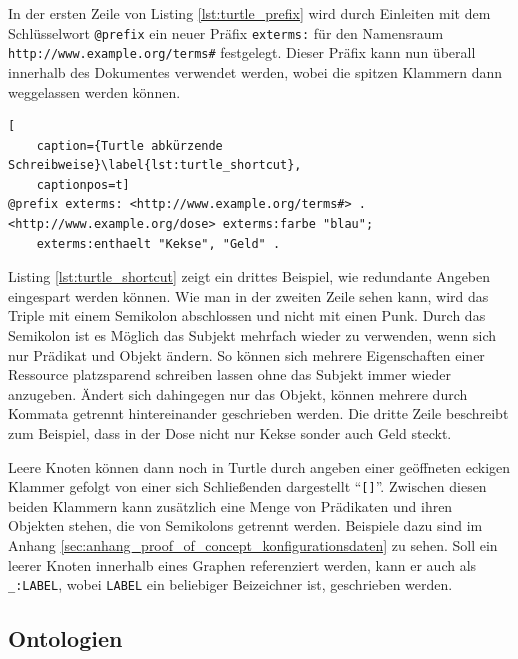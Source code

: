 In der ersten Zeile von Listing \ref{lst:turtle_prefix} wird durch Einleiten mit dem Schlüsselwort \texttt{@prefix} ein neuer Präfix \texttt{exterms:} für den Namensraum \texttt{http://www.example.org/terms\#} festgelegt. Dieser Präfix kann nun überall innerhalb des Dokumentes verwendet werden, wobei die spitzen Klammern dann weggelassen werden können.

\begin{lstlisting}[
    caption={Turtle abkürzende Schreibweise}\label{lst:turtle_shortcut},
    captionpos=t]
@prefix exterms: <http://www.example.org/terms#> .
<http://www.example.org/dose> exterms:farbe "blau";
    exterms:enthaelt "Kekse", "Geld" .   
\end{lstlisting}

Listing \ref{lst:turtle_shortcut} zeigt ein drittes Beispiel, wie redundante Angeben eingespart werden können. Wie man in der zweiten Zeile sehen kann, wird das Triple mit einem Semikolon abschlossen und nicht mit einen Punk. Durch das Semikolon ist es Möglich das Subjekt mehrfach wieder zu verwenden, wenn sich nur Prädikat und Objekt ändern. So können sich mehrere Eigenschaften einer Ressource platzsparend schreiben lassen ohne das Subjekt immer wieder anzugeben. Ändert sich dahingegen nur das Objekt, können mehrere durch Kommata getrennt hintereinander geschrieben werden. Die dritte Zeile beschreibt zum Beispiel, dass in der Dose nicht nur Kekse sonder auch Geld steckt. 

Leere Knoten können dann noch in Turtle durch angeben einer geöffneten eckigen Klammer gefolgt von einer sich Schließenden dargestellt \enquote{\texttt{[]}}. Zwischen diesen beiden Klammern kann zusätzlich eine Menge von Prädikaten und ihren Objekten stehen, die von Semikolons getrennt werden. Beispiele dazu sind im Anhang \ref{sec:anhang_proof_of_concept_konfigurationsdaten} zu sehen. Soll ein leerer Knoten innerhalb eines Graphen referenziert werden, kann er auch als \texttt{\_:LABEL}, wobei \texttt{LABEL} ein beliebiger Beizeichner ist, geschrieben werden.




\subsection{Ontologien} %
\label{sub:ontologien}

